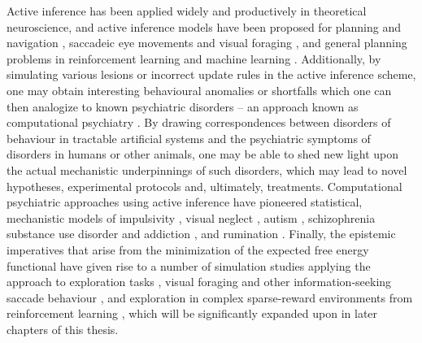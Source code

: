 Active inference has been applied widely and productively in theoretical neuroscience, and active inference models have been proposed for planning and navigation \citep{kaplan2018planning}, saccadeic eye movements \citep{parr2017uncertainty,parr2018active,parr2018anatomy} and visual foraging \citep{parr2019computational,heins2020deep}, and general planning problems in reinforcement learning and machine learning \citep{ueltzhoffer_deep_2018,tschantz2020reinforcement,tschantz2020control,millidge_deep_2019}. Additionally, by simulating various lesions or incorrect update rules in the active inference scheme, one may obtain interesting behavioural anomalies or shortfalls which one can then analogize to known psychiatric disorders -- an approach known as computational psychiatry \citep{parr2019computational,cullen2018active}. By drawing correspondences between disorders of behaviour in tractable artificial systems and the psychiatric symptoms of disorders in humans or other animals, one may be able to shed new light upon the actual mechanistic underpinnings of such disorders, which may lead to novel hypotheses, experimental protocols and, ultimately, treatments. Computational psychiatric approaches using active inference have pioneered statistical, mechanistic models of impulsivity \citep{mirza2019impulsivity}, visual neglect \citep{parr2018computational}, autism \citep{lawson2014aberrant}, schizophrenia \citep{adams2012smooth} substance use disorder and addiction \citep{schwartenbeck2015optimal}, and rumination \citep{hesp2020sophisticated}. Finally, the epistemic imperatives that arise from the minimization of the expected free energy functional have given rise to a number of simulation studies applying the approach to exploration tasks \citep{schwartenbeck2013exploration,friston2015active,friston2017curiosity}, visual foraging and other information-seeking saccade behaviour \citep{heins2020deep,parr2017active}, and exploration in complex sparse-reward environments from reinforcement learning \citep{tschantz2020reinforcement}, which will be significantly expanded upon in later chapters of this thesis.

